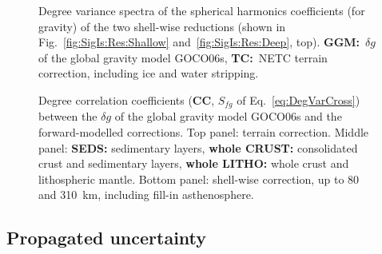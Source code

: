 \begin{figure}
    \begin{adjustbox}{center}
    \end{adjustbox}
    \caption[Degree variance spectra of the SH coefficients for the two shell-wise reductions.]{
        Degree variance spectra of the spherical harmonics coefficients (for gravity) of the two shell-wise reductions (shown in Fig.~\ref{fig:SigIs:Res:Shallow} and~\ref{fig:SigIs:Res:Deep}, top).
        \textbf{{GGM}:}~$\delta g$ of the global gravity model {GOCO06s},
        \textbf{{TC}:}~NETC terrain correction, including ice and water stripping.
        }
    \label{fig:SigIs:Spec:DegVarSD}
\end{figure}

\begin{figure}
    \begin{adjustbox}{center}
    \end{adjustbox}
    \caption[Temp caption.]{
        Degree correlation coefficients (\textbf{CC}, $S_{fg}$ of Eq.~\ref{eq:DegVarCross}) between the $\delta g$ of the global gravity model {GOCO06s} and the forward-modelled corrections.
        Top panel: terrain correction.
        Middle panel:
        \textbf{{SEDS}:} sedimentary layers,
        \textbf{{whole CRUST}:} consolidated crust and sedimentary layers,
        \textbf{{whole LITHO}:} whole crust and lithospheric mantle.
        Bottom panel: shell-wise correction, up to \num{80} and \SI{310}{\kilo \metre}, including fill-in asthenosphere.
        }
    \label{fig:SigIs:Res:XCorr}
\end{figure}

\subsection{Propagated uncertainty}
\label{ss:SigIs:Results:Uncertainty}

